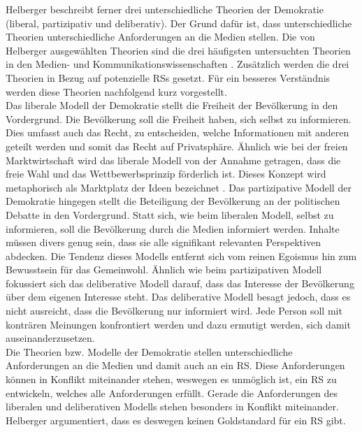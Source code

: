 Helberger beschreibt ferner drei unterschiedliche Theorien der Demokratie (liberal, partizipativ und deliberativ).
Der Grund dafür ist, dass unterschiedliche Theorien unterschiedliche Anforderungen an die Medien stellen.
Die von Helberger ausgewählten Theorien sind die drei häufigsten untersuchten Theorien in den Medien- und Kommunikationswissenschaften \cite{democratic-theories}.
Zusätzlich werden die drei Theorien in Bezug auf potenzielle \acp{RS} gesetzt.
Für ein besseres Verständnis werden diese Theorien nachfolgend kurz vorgestellt.\\

Das liberale Modell der Demokratie stellt die Freiheit der Bevölkerung in den Vordergrund.
Die Bevölkerung soll die Freiheit haben, sich selbst zu informieren.
Dies umfasst auch das Recht, zu entscheiden, welche Informationen mit anderen geteilt werden und somit das Recht auf Privatsphäre.
Ähnlich wie bei der freien Marktwirtschaft wird das liberale Modell von der Annahme getragen, dass die freie Wahl und das Wettbewerbsprinzip förderlich ist.
Dieses Konzept wird metaphorisch als \glqq Marktplatz der Ideen\grqq{} bezeichnet \cite{marketplace-ideas}.
Das partizipative Modell der Demokratie hingegen stellt die Beteiligung der Bevölkerung an der politischen Debatte in den Vordergrund.
Statt sich, wie beim liberalen Modell, selbst zu informieren, soll die Bevölkerung durch die Medien informiert werden.
Inhalte müssen divers genug sein, dass sie alle signifikant relevanten Perspektiven abdecken.
Die Tendenz dieses Modells entfernt sich vom reinen Egoismus hin zum Bewusstsein für das Gemeinwohl.
Ähnlich wie beim partizipativen Modell fokussiert sich das deliberative Modell darauf, dass das Interesse der Bevölkerung über dem eigenen Interesse steht.
Das deliberative Modell besagt jedoch, dass es nicht ausreicht, dass die Bevölkerung nur informiert wird.
Jede Person soll mit konträren Meinungen konfrontiert werden und dazu ermutigt werden, sich damit auseinanderzusetzen. \\

Die Theorien bzw. Modelle der Demokratie stellen unterschiedliche Anforderungen an die Medien und damit auch an ein \ac{RS}.
Diese Anforderungen können in Konflikt miteinander stehen, weswegen es unmöglich ist, ein \ac{RS} zu entwickeln, welches alle Anforderungen erfüllt.
Gerade die Anforderungen des liberalen und deliberativen Modells stehen besonders in Konflikt miteinander.
Helberger argumentiert, dass es deswegen keinen Goldstandard für ein \ac{RS} gibt.

